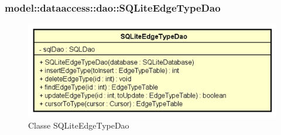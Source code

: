 \documentclass[../DefinizioneDiProdotto.tex]{subfiles}
\begin{document}
\subsubsection{model::dataaccess::dao::SQLiteEdgeTypeDao}

    \begin{figure}[H]
        \centering
        \includegraphics{img/SQLiteEdgeTypeDao.png}
        \caption{Classe SQLiteEdgeTypeDao}\label{fig:model::dataaccess::dao::SQLiteEdgeTypeDao} 
    \end{figure}
\end{document}
